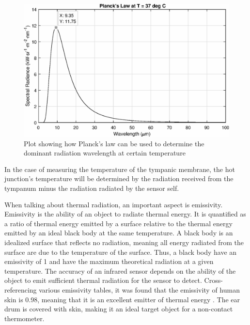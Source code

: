  \begin{figure}[h]
   \centering
   \includegraphics[scale=0.6]{figs/PlancksLaw}
   \caption{Plot showing how Planck's law can be used to determine the dominant radiation wavelength at certain temperature}
   \label{fig:PlancksLaw}
\end{figure}

In the case of measuring the temperature of the tympanic membrane, the hot junction's temperature will be determined by the radiation received from the tympanum minus the radiation radiated by the sensor self.

\medskip

When talking about thermal radiation, an important aspect is emissivity. Emissivity is the ability of an object to radiate thermal energy. It is quantified as a ratio of thermal energy emitted by a surface relative to the thermal energy emitted by an ideal black body at the same temperature. A black body is an idealized surface that reflects no radiation, meaning all energy radiated from the surface are due to the temperature of the surface. Thus, a black body have an emissivity of 1 and have the maximum theoretical radiation at a given temperature. The accuracy of an infrared sensor depends on the ability of the object to emit sufficient thermal radiation for the sensor to detect. Cross-referencing various emissivity tables, it was found that the emissivity of human skin is 0.98, meaning that it is an excellent emitter of thermal energy \citep{stumme2003emissivity} \citep{EmissivityThermoWorks} \citep{EmissivityOptotherm}. The ear drum is covered with skin, making it an ideal target object for a non-contact thermometer.

\medskip

